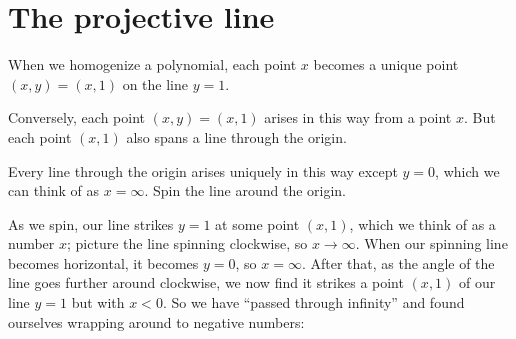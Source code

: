\section{The projective line}
When we homogenize a polynomial, each point \(x\) becomes a unique point \((x,y)=(x,1)\) on the line \(y=1\).
\begin{center}
\end{center}
Conversely, each point \((x,y)=(x,1)\) arises in this way from a point \(x\).
But each point \((x,1)\) also spans a line through the origin.
\begin{center}
\end{center}
Every line through the origin arises uniquely in this way except \(y=0\), which we can think of as \(x=\infty\).
Spin the line around the origin.
\begin{center}

\end{center}
As we spin, our line strikes \(y=1\) at some point \((x,1)\), which we think of as a number \(x\); picture the line spinning clockwise, so \(x\to\infty\).
When our spinning line becomes horizontal, it becomes \(y=0\), so \(x=\infty\).
After that, as the angle of the line goes further around clockwise, we now find it strikes a point \((x,1)\) of our line \(y=1\) but with \(x<0\).
So we have ``passed through infinity'' and found ourselves wrapping around to negative numbers:
\begin{center}

\end{center}

